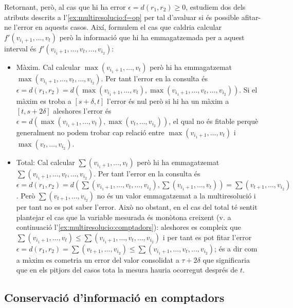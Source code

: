 Retornant, però, al cas que hi ha error $\epsilon=d(r_1,r_2)\geq 0$,
estudiem dos dels atributs descrits a
l'\autoref{ex:multiresolucio:f=op} per tal d'avaluar si és possible
afitar-ne l'error en aquests casos. Així, formulem el cas que caldria
calcular $f'(v_{i_1+1},\dotsc,v_{t})$ però la informació que hi ha
emmagatzemada per a aquest interval és
$f'(v_{i_1+1},\dotsc,v_{t},\dotsc,v_{i_2})$:
\begin{itemize}

\item Màxim. Cal calcular $\max(v_{i_1+1},\dotsc,v_{t})$ però hi ha
  emmagatzemat $\max(v_{i_1+1},\dotsc,v_{t},\dotsc,v_{i_2})$.  Per
  tant l'error en la consulta és $\epsilon=d(r_1,r_2)=
  d(\max(v_{i_1+1},\dotsc,v_{t}),\max(v_{i_1+1},\dotsc,v_{t},\dotsc,v_{i_2}))$. Si
  el màxim es troba a $[s+\delta,t]$ l'error és nul però si hi
  ha un màxim a $[t,s+2\delta]$ aleshores l'error és
  $\epsilon=d(\max(v_{i_1+1},\dotsc,v_{t}),\max(v_{t},\dotsc,v_{i_2}))$,
  el qual no és fitable perquè generalment no podem trobar cap relació
  entre $\max(v_{i_1+1},\dotsc,v_{t})$ i $\max(v_{t},\dotsc,v_{i_2})$.


\item Total: Cal calcular $\sum(v_{i_1+1},\dotsc,v_{t})$ però hi ha
  emmagatzemat $\sum(v_{i_1+1},\dotsc,v_{t},\dotsc,v_{i_2})$. Per tant
  l'error en la consulta és $\epsilon=d(r_1,r_2)=d(
  \sum(v_{i_1+1},\dotsc,v_{t},\dotsc,v_{i_2}),\sum(v_{i_1+1},\dotsc,v_{t}))
  = \sum(v_{t+1},\dotsc,v_{i_2})$. Però $\sum(v_{t+1},\dotsc,v_{i_2})$
  no és un valor emmagatzemat a la multiresolució i per tant no es pot
  saber l'error. Això no obstant, en el cas del total té sentit
  plantejar el cas que la variable mesurada és monòtona creixent (v. a
  continuació l'\autoref{ex:multiresolucio:comptadors}): aleshores es
  compleix que $\sum(v_{i_1+1},\dotsc,v_{t}) \leq
  \sum(v_{i_1+1},\dotsc,v_{t},\dotsc,v_{i_2})$ i per tant es pot fitar
  l'error $\epsilon=d(r_1,r_2) = \sum(v_{t+1},\dotsc,v_{i_2}) \leq
  \sum(v_{i_1+1},\dotsc,v_{t},\dotsc,v_{i_2})$; és a dir com a màxim
  es cometria un error del valor consolidat a $\tau+2\delta$ que
  significaria que en els pitjors del casos tota la mesura hauria
  ocorregut després de $t$.


\end{itemize}






\subsection{Conservació d'informació en comptadors}
  \label{ex:multiresolucio:comptadors}



